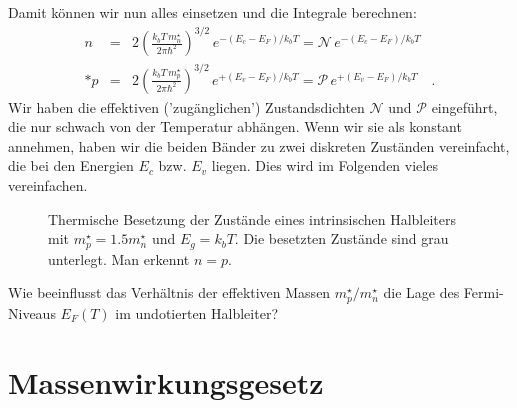 Damit können wir nun alles einsetzen und die Integrale berechnen:
\begin{eqnarray}
    n &=& 2 \left( \frac{ k_b T \,  m^\star_n } {2 \pi \hbar^2} \right)^{3/2} \, e^{- (E_c - E_F) / k_b T} = \mathcal{N} \, e^{- (E_c - E_F) / k_b T} \\*  
    p &=& 2 \left( \frac{ k_b T \,  m^\star_p } {2 \pi \hbar^2} \right)^{3/2} \, e^{+ (E_v - E_F) / k_b T} = \mathcal{P} \, e^{+ (E_v - E_F) / k_b T}  \quad . \label{eq:5_konz_zugaenglich}
\end{eqnarray}
Wir haben die effektiven ('zugänglichen') Zustandsdichten $\mathcal{N}$ und $\mathcal{P}$ eingeführt, die nur schwach von der Temperatur abhängen. Wenn wir sie als konstant annehmen, haben wir die beiden Bänder zu zwei diskreten Zuständen vereinfacht, die bei den Energien $E_c$ bzw. $E_v$ liegen. Dies wird im Folgenden vieles vereinfachen.

\begin{figure}
    \caption{Thermische Besetzung der Zustände eines intrinsischen Halbleiters mit 
    $m^\star_p = 1.5 m^\star_n$ und $E_g = k_b T$. 
    Die besetzten Zustände sind grau unterlegt. Man erkennt $n=p$. }
\end{figure}

\begin{questions}
    \item Wie beeinflusst das Verhältnis der effektiven Massen  $m^\star_p / m^\star_n$ die Lage des Fermi-Niveaus $E_F(T)$ im undotierten Halbleiter?
\end{questions}



\section{Massenwirkungsgesetz}

